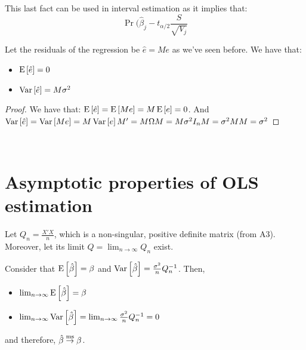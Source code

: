 This last fact can be used in interval estimation as it implies that: $$\operatorname{Pr}(\hat{\beta}_j - t_{\alpha /2}\frac{S}{\sqrt{V_j}} $$

\begin{proposition}
Let the residuals of the regression be $\hat{e} = Me$ as we've seen before. We have that:\begin{itemize}
\item $\operatorname{E}\left[\hat{e}\right] = 0$
\item $\operatorname{Var}\left[\hat{e}\right] = M\sigma^2$
\end{itemize}
\end{proposition}
\begin{proof}
We have that: $\operatorname{E}\left[\hat{e}\right] = \operatorname{E}\left[Me\right] = M\operatorname{E}\left[e\right] = 0$. And $\operatorname{Var}\left[\hat{e}\right] = \operatorname{Var}\left[Me\right] = M\operatorname{Var}\left[e\right]M' = M\Omega M = M\sigma^2I_nM = \sigma^2MM = \sigma^2$
\end{proof}

\

\section{Asymptotic properties of OLS estimation}

\begin{proposition}
Let $Q_n = \frac{X'X}{n}$, which is a non-singular, positive definite matrix (from A3). Moreover, let its limit $Q = \lim_{n\to\infty} Q_n$ exist.

Consider that $\operatorname{E}\left[\hat{\beta}\right]=\beta$ and $\operatorname{Var}\left[\hat{\beta}\right] = \frac{\sigma^2}{n}Q_n^{-1}$. Then, \begin{itemize}
\item $\lim_{n\to\infty}\operatorname{E}\left[\hat{\beta}\right] = \beta$
\item $\lim_{n\to\infty}\operatorname{Var}\left[\hat{\beta}\right] = \lim_{n\to\infty} \frac{\sigma^2}{n}Q_n^{-1} = 0$
\end{itemize}
and therefore, $\hat{\beta}\overset{\text{ms}}{\to}\beta$.
\end{proposition}

\begin{proposition}

\end{proposition}
